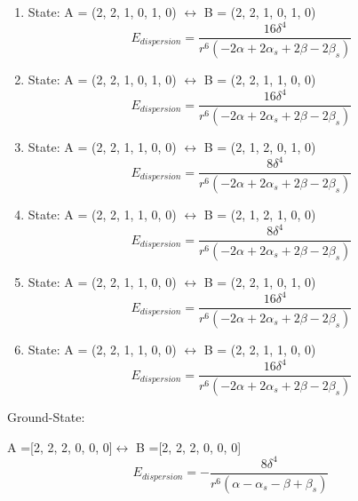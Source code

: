 \documentclass[12pt,a4paper]{article}
\begin{document}
\begin{enumerate}
$$E_{dispersion} =\frac{8 \delta^{4}}{r^{6} \left(- 2 \alpha + 2 \alpha_{s} + 2 \beta - 2 \beta_{s}\right)}$$
 \item State: A = (2, 2, 1, 0, 1, 0) $\leftrightarrow$ B = (2, 2, 1, 0, 1, 0) 
$$E_{dispersion} =\frac{16 \delta^{4}}{r^{6} \left(- 2 \alpha + 2 \alpha_{s} + 2 \beta - 2 \beta_{s}\right)}$$
 \item State: A = (2, 2, 1, 0, 1, 0) $\leftrightarrow$ B = (2, 2, 1, 1, 0, 0) 
$$E_{dispersion} =\frac{16 \delta^{4}}{r^{6} \left(- 2 \alpha + 2 \alpha_{s} + 2 \beta - 2 \beta_{s}\right)}$$
 \item State: A = (2, 2, 1, 1, 0, 0) $\leftrightarrow$ B = (2, 1, 2, 0, 1, 0) 
$$E_{dispersion} =\frac{8 \delta^{4}}{r^{6} \left(- 2 \alpha + 2 \alpha_{s} + 2 \beta - 2 \beta_{s}\right)}$$
 \item State: A = (2, 2, 1, 1, 0, 0) $\leftrightarrow$ B = (2, 1, 2, 1, 0, 0) 
$$E_{dispersion} =\frac{8 \delta^{4}}{r^{6} \left(- 2 \alpha + 2 \alpha_{s} + 2 \beta - 2 \beta_{s}\right)}$$
 \item State: A = (2, 2, 1, 1, 0, 0) $\leftrightarrow$ B = (2, 2, 1, 0, 1, 0) 
$$E_{dispersion} =\frac{16 \delta^{4}}{r^{6} \left(- 2 \alpha + 2 \alpha_{s} + 2 \beta - 2 \beta_{s}\right)}$$
 \item State: A = (2, 2, 1, 1, 0, 0) $\leftrightarrow$ B = (2, 2, 1, 1, 0, 0) 
$$E_{dispersion} =\frac{16 \delta^{4}}{r^{6} \left(- 2 \alpha + 2 \alpha_{s} + 2 \beta - 2 \beta_{s}\right)}$$
\end{enumerate}
Ground-State:

A =[2, 2, 2, 0, 0, 0]$\leftrightarrow$ B =[2, 2, 2, 0, 0, 0]
$$E_{dispersion} =- \frac{8 \delta^{4}}{r^{6} \left(\alpha - \alpha_{s} - \beta + \beta_{s}\right)}$$
\end{document}
